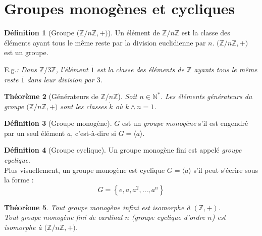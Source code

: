 \documentclass[11pt,a4paper]{report}
\newtheorem{theorem}{Théorème}[chapter]
\newtheorem{itheorem}[theorem]{Théorème}
\theoremstyle{definition}
\newtheorem{dfn}[theorem]{Définition}
\begin{document}
\section{Groupes monogènes et cycliques} %
\label{sec:groupes_monogenes_et_cycliques}
\begin{dfn}[Groupe $\big( \mathbb{Z}/n\mathbb{Z},+ \big)$]
Un élément de $\mathbb{Z}/ n\mathbb{Z}$ est la classe des éléments ayant tous le même reste par la division euclidienne par $n$.\newline
$\big( \mathbb{Z}/n\mathbb{Z},+ \big)$ est un groupe.
\end{dfn}
E.g.\textit{: Dans $\mathbb{Z}/3\mathbb{Z}$, l'élément $\bar{1}$ est la classe des éléments de $\mathbb{Z}$ ayants tous le même reste $\bar{1}$ dans leur division par $3$.}
\begin{theorem}[Générateurs de $\mathbb{Z}/n\mathbb{Z}$]
     Soit $n\in \mathbb{N}^*$. Les éléments générateurs du groupe $\big( \mathbb{Z}/n\mathbb{Z},+ \big)$ sont les classes $\dot{k}$ où $k \wedge n = 1$.
\end{theorem}
\begin{dfn}[Groupe monogène]
     $G$ est un \emph{groupe monogène} s'il est engendré par un seul élément $a$, c'est-à-dire si $G = \langle a \rangle$.
\end{dfn}
\begin{dfn}[Groupe cyclique]
     Un groupe monogène fini est appelé \emph{groupe cyclique}.\\
     Plus visuellement, un groupe monogène est cyclique $G = \langle a \rangle$ s'il peut s'écrire sous la forme : 
     \[G = \left\lbrace e,a,a^2,\ldots,a^n \right\rbrace \]
\end{dfn}
\begin{itheorem}
     Tout groupe monogène infini est isomorphe à $(\mathbb{Z},+)$.\\
     Tout groupe monogène fini de cardinal $n$ (groupe cyclique d'ordre $n$) est isomorphe à $\big(\mathbb{Z}/n\mathbb{Z},+\big)$.
\end{itheorem}

\end{document}
